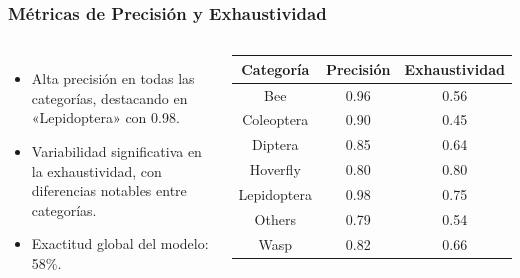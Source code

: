 \begin{frame}
    \frametitle{Métricas de Precisión y Exhaustividad}
    \begin{columns}
        \begin{itemize}
            \item Alta precisión en todas las categorías, destacando en «Lepidoptera» con 0.98.
            \item Variabilidad significativa en la exhaustividad, con diferencias notables entre categorías.
            \item Exactitud global del modelo: 58\%.
        \end{itemize}
    \vspace*{-0.5cm}
    \begin{center}\small
        \begin{tabular}{ccc}
            \toprule
            \textbf{Categoría} & \textbf{Precisión}  &  \textbf{Exhaustividad}\\ 
            \midrule
            Bee &  0.96 &  0.56 \\
            Coleoptera &  0.90 &  0.45 \\
            Diptera &  0.85 &  0.64 \\
            Hoverfly &  0.80 &  0.80 \\
            Lepidoptera &  0.98 &  0.75 \\
            Others &  0.79 &  0.54 \\
            Wasp &  0.82 &  0.66 \\
            \bottomrule
        \end{tabular}
    \end{center}
\end{columns}
\end{frame}

